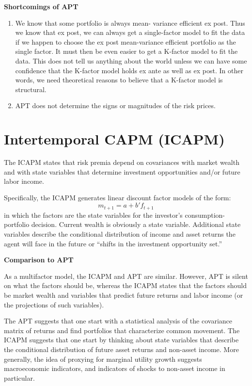 \documentclass[
]{book}
\providecommand{\tightlist}{%
  \setlength{\itemsep}{0pt}\setlength{\parskip}{0pt}}
\begin{document}
\textbf{Shortcomings of APT}

\begin{enumerate}
\def\labelenumi{\arabic{enumi}.}
\tightlist
\item
  We know that some portfolio is always mean- variance efficient ex post. Thus we know that ex post, we can always get a single-factor model to fit the data if we happen to choose the ex post mean-variance efficient portfolio as the single factor. It must then be even easier to get a K-factor model to fit the data. This does not tell us anything about the world unless we can have some confidence that the K-factor model holds ex ante as well as ex post. In other words, we need theoretical reasons to believe that a K-factor model is structural.
\item
  APT does not determine the signs or magnitudes of the risk prices.
\end{enumerate}

\hypertarget{intertemporal-capm-icapm}{%
\section{Intertemporal CAPM (ICAPM)}\label{intertemporal-capm-icapm}}

The ICAPM states that risk premia depend on covariances with market wealth and with state variables that determine investment opportunities and/or future labor income.

Specifically, the ICAPM generates linear discount factor models of the form:
\[
m_{t+1} = a + b'f_{t+1}
\]
in which the factors are the state variables for the investor's consumption-portfolio decision. Current wealth is obviously a state variable. Additional state variables describe the conditional distribution of income and asset returns the agent will face in the future or ``shifts in the investment opportunity set.''

\textbf{Comparison to APT}

As a multifactor model, the ICAPM and APT are similar. However, APT is silent on what the factors should be, whereas the ICAPM states that the factors should be market wealth and variables that predict future returns and labor income (or the projections of such variables).

The APT suggests that one start with a statistical analysis of the covariance matrix of returns and find portfolios that characterize common movement. The ICAPM suggests that one start by thinking about state variables that describe the conditional distribution of future asset returns and non-asset income. More generally, the idea of proxying for marginal utility growth suggests macroeconomic indicators, and indicators of shocks to non-asset income in particular.
\end{document}
